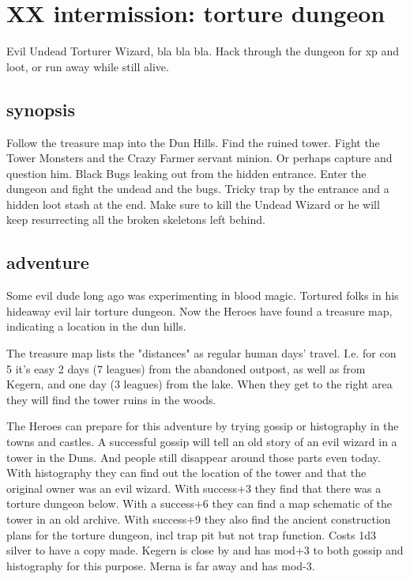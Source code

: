 \newpage
\section*{XX intermission: torture dungeon}

Evil Undead Torturer Wizard, bla bla bla. Hack through the dungeon for xp and loot, or run away while still alive.


\subsection*{synopsis}

Follow the treasure map into the Dun Hills. Find the ruined tower. Fight the Tower Monsters and the Crazy Farmer servant minion. Or perhaps capture and question him. Black Bugs leaking out from the hidden entrance. Enter the dungeon and fight the undead and the bugs. Tricky trap by the entrance and a hidden loot stash at the end. Make sure to kill the Undead Wizard or he will keep resurrecting all the broken skeletons left behind.


\subsection*{adventure}

Some evil dude long ago was experimenting in blood magic. Tortured folks in his hideaway evil lair torture dungeon. Now the Heroes have found a treasure map, indicating a location in the dun hills.


The treasure map lists the "distances" as regular human days' travel. I.e. for con 5 it's easy 2 days (7 leagues) from the abandoned outpost, as well as from Kegern, and one day (3 leagues) from the lake.
When they get to the right area they will find the tower ruins in the woods.

The Heroes can prepare for this adventure by trying gossip or histography in the towns and castles. A successful gossip will tell an old story of an evil wizard in a tower in the Duns. And people still disappear around those parts even today. With histography they can find out the location of the tower and that the original owner was an evil wizard. With success+3 they find that there was a torture dungeon below. With a success+6 they can find a map schematic of the tower in an old archive. With success+9 they also find the ancient construction plans for the torture dungeon, incl trap pit but not trap function. Costs 1d3 silver to have a copy made. Kegern is close by and has mod+3 to both gossip and histography for this purpose. Merna is far away and has mod-3.



